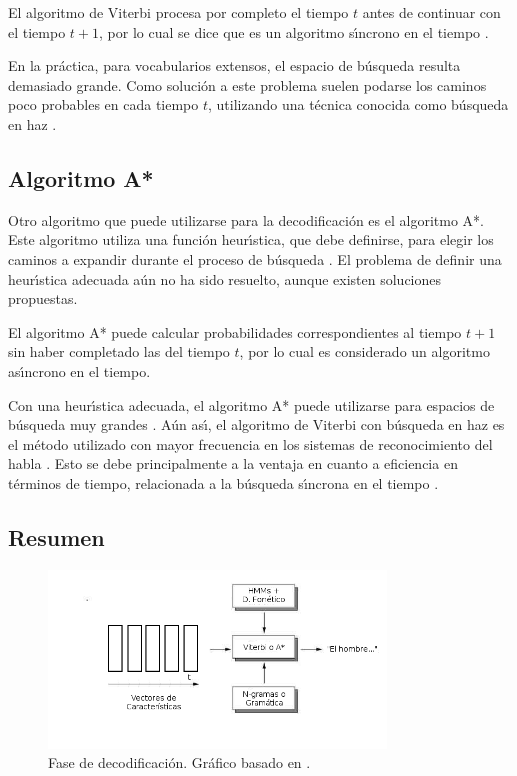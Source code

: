El algoritmo de Viterbi procesa por completo el tiempo $t$ antes de continuar con el tiempo $t + 1$, por
lo cual se dice que es un algoritmo s{\'\i}ncrono en el tiempo \cite{huang-handbook10}.

En la pr\'actica, para vocabularios extensos, el espacio de b\'usqueda resulta demasiado grande.
Como soluci\'on a este problema suelen podarse los caminos poco probables en cada tiempo $t$,
utilizando una t\'ecnica conocida como b\'usqueda en haz \cite{Jurafsky}.

\subsection{Algoritmo A*}

Otro algoritmo que puede utilizarse para la decodificaci\'on es el algoritmo A*. Este algoritmo
utiliza una funci\'on heur{\'\i}stica, que debe definirse, para elegir los caminos a expandir
durante el proceso de b\'usqueda \cite{Russell2003Solving}. 
El problema de definir una heur{\'\i}stica adecuada a\'un no ha sido resuelto, aunque existen soluciones propuestas.

El algoritmo A* puede calcular probabilidades correspondientes al tiempo $t + 1$ sin haber completado 
las del tiempo $t$, por lo cual es considerado un algoritmo as{\'\i}ncrono en el tiempo.

Con una heur{\'\i}stica adecuada, el algoritmo A* puede utilizarse para espacios de b\'usqueda 
muy grandes \cite{huang-handbook10}.
A\'un as{\'\i}, el algoritmo de Viterbi con b\'usqueda en haz es el m\'etodo utilizado con mayor frecuencia
en los sistemas de reconocimiento del habla \cite{huang-handbook10}. 
Esto se debe principalmente a la ventaja en cuanto a eficiencia en t\'erminos de tiempo, 
relacionada a la b\'usqueda s{\'\i}ncrona en el tiempo \cite{huang-handbook10}.


\subsection{Resumen}

\begin{figure}[H] 
\centering
\includegraphics[width=0.8\textwidth]{./graphics/decodificacion.png}
\caption{Fase de decodificaci\'on. Gr\'afico basado en \cite{VerenichASR}.}
\label{figure:hmm}
\end{figure}

